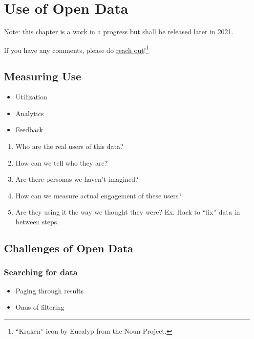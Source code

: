 \documentclass[
  openany]{book}
\providecommand{\tightlist}{%
  \setlength{\itemsep}{0pt}\setlength{\parskip}{0pt}}
\begin{document}
\hypertarget{use}{%
\chapter{Use of Open Data}\label{use}}

Note: this chapter is a work in a progress but shall be released later in 2021.

If you have any comments, please do \href{https://github.com/open-data-people/open-data-field-guide/discussions/new}{reach out}!\footnote{``Kraken'' icon by Eucalyp from the Noun Project.}

\hypertarget{measuring-use}{%
\section{Measuring Use}\label{measuring-use}}

\begin{itemize}
\tightlist
\item
  Utilization
\item
  Analytics
\item
  Feedback
\end{itemize}

\begin{enumerate}
\def\labelenumi{\arabic{enumi}.}
\tightlist
\item
  Who are the real users of this data?
\item
  How can we tell who they are?
\item
  Are there personas we haven't imagined?
\item
  How can we measure actual engagement of these users?
\item
  Are they using it the way we thought they were? Ex. Hack to ``fix'' data in between steps.
\end{enumerate}

\hypertarget{challenges-of-open-data}{%
\section{Challenges of Open Data}\label{challenges-of-open-data}}

\hypertarget{searching-for-data}{%
\subsection{Searching for data}\label{searching-for-data}}

\begin{itemize}
\tightlist
\item
  Paging through results
\item
  Onus of filtering
\end{itemize}
\end{document}
